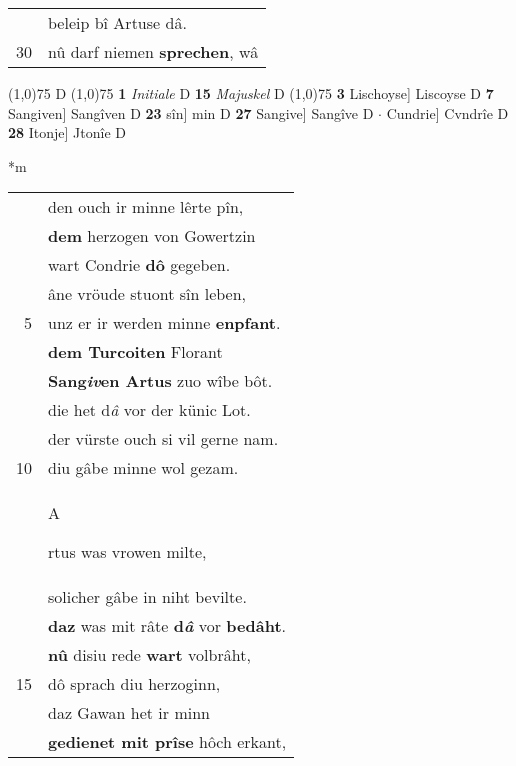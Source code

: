 \documentclass[8pt,a4paper,notitlepage]{article}
\begin{document}
\begin{table}[ht]
\begin{minipage}[t]{0.5\linewidth}
\begin{tabular}{rl}
 & beleip bî Artuse dâ.\\ 
30 & nû darf niemen \textbf{sprechen}, wâ\\ 
\end{tabular}
\scriptsize
\line(1,0){75} \newline
D \newline
\line(1,0){75} \newline
\textbf{1} \textit{Initiale} D  \textbf{15} \textit{Majuskel} D  \newline
\line(1,0){75} \newline
\textbf{3} Lischoyse] Liscoyse D \textbf{7} Sangiven] Sangîven D \textbf{23} sîn] min D \textbf{27} Sangive] Sangîve D  $\cdot$ Cundrie] Cvndrîe D \textbf{28} Itonje] Jtonîe D \newline
\end{minipage}
\hspace{0.5cm}
\begin{minipage}[t]{0.5\linewidth}
\small
\begin{center}*m
\end{center}
\begin{tabular}{rl}
 & den ouch ir minne lêrte pîn,\\ 
 & \textbf{dem} herzogen von Gowertzin\\ 
 & wart Condrie \textbf{dô} gegeben.\\ 
 & âne vröude stuont sîn leben,\\ 
5 & unz er ir werden minne \textbf{enpfant}.\\ 
 & \textbf{dem Turcoiten} Florant\\ 
 & \textbf{Sang\textit{iv}en Artus} zuo wîbe bôt.\\ 
 & die het d\textit{â} vor der künic Lot.\\ 
 & der vürste ouch si vil gerne nam.\\ 
10 & diu gâbe minne wol gezam.\\ 
 & \begin{large}A\end{large}rtus was vrowen milte,\\ 
 & solicher gâbe in niht bevilte.\\ 
 & \textbf{daz} was mit râte \textbf{d\textit{â}} vor \textbf{bedâht}.\\ 
 & \textbf{nû} disiu rede \textbf{wart} volbrâht,\\ 
15 & dô sprach diu herzoginn,\\ 
 & daz Gawan het ir minn\\ 
 & \textbf{gedienet mit prîse} hôch erkant,\\ 

\end{tabular}
\end{minipage}
\end{table}
\end{document}
